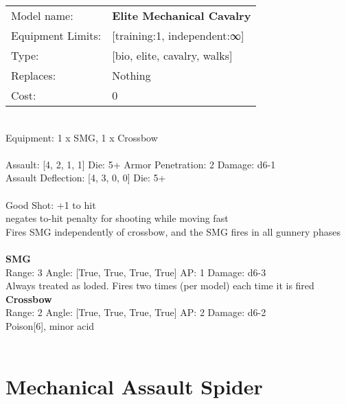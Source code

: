 \noindent
\begin{tabular}{ll}
Model name: &{\bf Elite Mechanical Cavalry } \\
Equipment Limits: &[training:1, independent:∞] \\
Type: &[bio, elite, cavalry, walks] \\
Replaces: &Nothing \\
Cost: & 0\\
\end{tabular}
\ \\
Equipment: 1 x SMG, 1 x Crossbow \\
\ \\
Assault: [4, 2, 1, 1] Die: 5+ Armor Penetration: 2 Damage: d6-1 \\
Assault Deflection: [4, 3, 0, 0] Die: 5+\\
\indent  
\ \\
Good Shot: +1 to hit\\ 
negates to-hit penalty for shooting while moving fast\\ 
Fires SMG independently of crossbow, and the SMG fires in all gunnery phases\\ 

\ \\
{\bf SMG } \\



Range: 3  Angle: [True, True, True, True] AP: 1 Damage: d6-3 \\
Always treated as loded. Fires two times (per model) each time it is fired\\ 




{\bf Crossbow } \\



Range: 2  Angle: [True, True, True, True] AP: 2 Damage: d6-2 \\
Poison[6], minor acid\\ 




 
\ \\













\clearpage

\section{ Mechanical Assault Spider }

